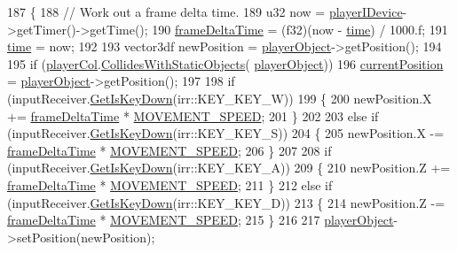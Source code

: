 \begin{DoxyCode}
187 \{
188     \textcolor{comment}{// Work out a frame delta time.}
189     u32 now = \hyperlink{_player_8cpp_acc0d822bdc6a1983133abc5ba4fceecb}{playerIDevice}->getTimer()->getTime();
190     \hyperlink{_player_8cpp_adc988571147642cda93afbf89783f9c9}{frameDeltaTime} = (f32)(now - \hyperlink{_player_8cpp_ab683520676b99a7bcc7a6299eb886247}{time}) / 1000.f;
191     \hyperlink{_player_8cpp_ab683520676b99a7bcc7a6299eb886247}{time} = now;
192 
193     vector3df newPosition = \hyperlink{_player_8cpp_a0dc161b57661226afd81ffc4ba4f21d9}{playerObject}->getPosition();
194 
195     \textcolor{keywordflow}{if} (\hyperlink{_player_8cpp_a3ea8274de548d0594347dd6a211fa395}{playerCol}.\hyperlink{class_collision_a334467ec1c8b7889aa46016fcedb13f9}{CollidesWithStaticObjects}(
      \hyperlink{_player_8cpp_a0dc161b57661226afd81ffc4ba4f21d9}{playerObject}))
196         \hyperlink{_player_8cpp_a03b83ef76d66d83d5eb75ce553ec0ec6}{currentPosition} = \hyperlink{_player_8cpp_a0dc161b57661226afd81ffc4ba4f21d9}{playerObject}->getPosition();
197 
198     \textcolor{keywordflow}{if} (inputReceiver.\hyperlink{class_input_receiver_a2322abecb1c388e0b3ead87e56862f1d}{GetIsKeyDown}(irr::KEY\_KEY\_W))
199     \{
200         newPosition.X += \hyperlink{_player_8cpp_adc988571147642cda93afbf89783f9c9}{frameDeltaTime} * \hyperlink{_player_8cpp_a8abf91f285c510ce8f0e664198252f42}{MOVEMENT\_SPEED};
201     \}
202 
203     \textcolor{keywordflow}{else} \textcolor{keywordflow}{if} (inputReceiver.\hyperlink{class_input_receiver_a2322abecb1c388e0b3ead87e56862f1d}{GetIsKeyDown}(irr::KEY\_KEY\_S))
204     \{
205         newPosition.X -= \hyperlink{_player_8cpp_adc988571147642cda93afbf89783f9c9}{frameDeltaTime} * \hyperlink{_player_8cpp_a8abf91f285c510ce8f0e664198252f42}{MOVEMENT\_SPEED};
206     \}
207 
208     \textcolor{keywordflow}{if} (inputReceiver.\hyperlink{class_input_receiver_a2322abecb1c388e0b3ead87e56862f1d}{GetIsKeyDown}(irr::KEY\_KEY\_A))
209     \{
210         newPosition.Z += \hyperlink{_player_8cpp_adc988571147642cda93afbf89783f9c9}{frameDeltaTime} * \hyperlink{_player_8cpp_a8abf91f285c510ce8f0e664198252f42}{MOVEMENT\_SPEED};
211     \}
212     \textcolor{keywordflow}{else} \textcolor{keywordflow}{if} (inputReceiver.\hyperlink{class_input_receiver_a2322abecb1c388e0b3ead87e56862f1d}{GetIsKeyDown}(irr::KEY\_KEY\_D))
213     \{
214         newPosition.Z -= \hyperlink{_player_8cpp_adc988571147642cda93afbf89783f9c9}{frameDeltaTime} * \hyperlink{_player_8cpp_a8abf91f285c510ce8f0e664198252f42}{MOVEMENT\_SPEED};
215     \}
216 
217     \hyperlink{_player_8cpp_a0dc161b57661226afd81ffc4ba4f21d9}{playerObject}->setPosition(newPosition);

\end{DoxyCode}
